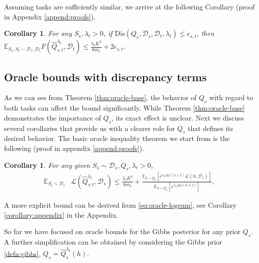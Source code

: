 \documentclass{article}
\theoremstyle{plain}
\newtheorem{corollary}[theorem]{Corollary}
\theoremstyle{definition}
\theoremstyle{remark}
\begin{document}
Assuming tasks are sufficiently similar, we arrive at the following Corollary (proof in Appendix \ref{append:proofs}).
\begin{corollary}
For any $S_s, \lambda_t>0$, 
    if $\mathrm{Dis}(Q_s,\mathcal{D}_s, \mathcal{D}_t, \lambda_t ) \leq \epsilon_{s,t}$,
    then 
    $
\mathbb{E}_{S_s,S_t\sim \mathcal{D}_s,\mathcal{D}_t}F(\hat{Q}^{\lambda_t}_{s:t},\mathcal{D}_t)\leq \frac{\lambda_t K^2}{8m_t} + 2\epsilon_{s,t} .$
\end{corollary}

\subsection{Oracle bounds with discrepancy terms}

As we can see from Theorem \ref{thm:oracle-base}, the behavior of $Q_s$ with regard to both tasks can affect the bound significantly. 
 While Theorem \ref{thm:oracle-base} demonstrates the importance of $Q_s$, its exact effect is unclear. Next we discuss several corollaries that provide us with a clearer role for $Q_s$ that defines its desired behavior.
 The basic oracle inequality theorem we start from is the following (proof in appendix \ref{append:proofs}).
%
\begin{corollary} \label{thm:oracle-logsum}
For any given $S_s\sim \mathcal{D}_s, Q_s, \lambda_t>0$, 
%
\begin{align} \label{eq:oracle-logsum}
\mathbb{E}_{S_t\sim \mathcal{D}_t}&\mathcal{L}( \hat{Q}^{\lambda_t}_{s:t},\mathcal{D}_s)\leq \frac{\lambda_t K^2}{8m_t}+\frac{\mathbb{E}_{h\sim Q_s}\left [e^{\lambda_t\Delta \mathcal{L}(h,s,t)}\mathcal{L}(h,\mathcal{D}_s) \right ]}{\mathbb{E}_{h\sim Q_s}\left [e^{\lambda_t\Delta \mathcal{L}(h,s,t)}\right ]}, 
\end{align}
\end{corollary}
%
A more explicit bound can be derived from \eqref{eq:oracle-logsum}, see Corollary \ref{corollary:appendix} in the Appendix.

So far we have focused on oracle bounds for the Gibbs posterior for any prior $Q_s$. A further simplification can be obtained by considering the Gibbs prior \eqref{defn:gibbs},  $Q_s=\hat{Q}^{\lambda_t}_{s}(h).$
\end{document}
